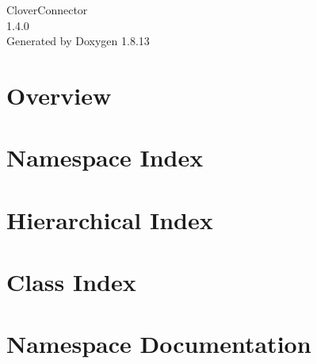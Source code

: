 \documentclass[twoside]{book}
\newcommand{\+}{\discretionary{\mbox{\scriptsize$\hookleftarrow$}}{}{}}
\newcommand{\clearemptydoublepage}{%
  \newpage{\pagestyle{empty}\cleardoublepage}%
}
\begin{document}
\hypersetup{pageanchor=false,
             bookmarksnumbered=true,
             pdfencoding=unicode
            }
\begin{titlepage}
\vspace*{7cm}
\begin{center}%
{\Large Clover\+Connector \\[1ex]\large 1.\+4.\+0 }\\
\vspace*{1cm}
{\large Generated by Doxygen 1.8.13}\\
\end{center}
\end{titlepage}
\clearemptydoublepage
{}
\tableofcontents
\clearemptydoublepage
{}
\hypersetup{pageanchor=true}

\chapter{Overview}
\label{index}\hypertarget{index}{}
\chapter{Namespace Index}

\chapter{Hierarchical Index}

\chapter{Class Index}

\chapter{Namespace Documentation}




















\end{document}

